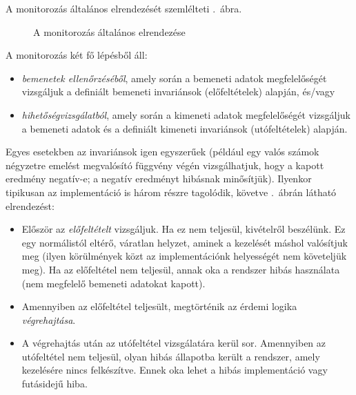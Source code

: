 A monitorozás általános elrendezését szemlélteti .~ábra.

\begin{figure}[h]
	\centering
	
	
	\caption{A monitorozás általános elrendezése}
	\label{fig:monitorozas-elrendezes}
\end{figure}

A monitorozás két fő lépésből áll:
\begin{itemize}
\item \emph{bemenetek ellenőrzéséből}, amely során a bemeneti adatok megfelelőségét vizsgáljuk a definiált bemeneti invariánsok (előfeltételek) alapján, és/vagy
\item \emph{hihetőségvizsgálatból}, amely során a kimeneti adatok megfelelőségét vizsgáljuk a bemeneti adatok és a definiált kimeneti invariánsok (utófeltételek) alapján.
\end{itemize}

Egyes esetekben az invariánsok igen egyszerűek (például egy valós számok négyzetre emelést megvalósító függvény végén vizsgálhatjuk, hogy a kapott eredmény negatív-e; a negatív eredményt hibásnak minősítjük). Ilyenkor tipikusan az implementáció is három részre tagolódik, követve .~ábrán látható elrendezést:
\begin{itemize}
\item Először az \emph{előfeltételt} vizsgáljuk. Ha ez nem teljesül, kivételről beszélünk. Ez egy normálistól eltérő, váratlan helyzet, aminek a kezelését máshol valósítjuk meg (ilyen körülmények közt az implementációnk helyességét nem követeljük meg). Ha az előfeltétel nem teljesül, annak oka a rendszer hibás használata (nem megfelelő bemeneti adatokat kapott).
\item Amennyiben az előfeltétel teljesült, megtörténik az érdemi logika \emph{végrehajtása}.
\item A végrehajtás után az utófeltétel vizsgálatára kerül sor. Amennyiben az utófeltétel nem teljesül, olyan hibás állapotba került a rendszer, amely kezelésére nincs felkészítve. Ennek oka lehet a hibás implementáció vagy futásidejű hiba.
\end{itemize}


